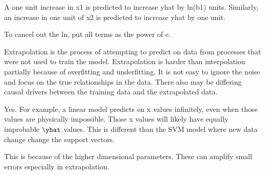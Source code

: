 \documentclass[12pt]{article}
\begin{document}
\begin{enumerate}
A one unit increase in x1 is predicted to increase yhat by ln(b1) units. Similarly, an increase in one unit of x2 is predicted to increase yhat by one unit. 


To cancel out the ln, put all terms as the power of e. 

\end{enumerate}




\begin{enumerate}


Extrapolation is the process of attempting to predict on data from processes that were not used to train the model. Extrapolation is harder than interpolation partially because of overfitting and underfitting. It is not easy to ignore the noise and focus on the true relationships in the data. There also may be differing causal drivers between the training data and the extrapolated data.  


Yes. For example, a linear model predicts on x values infinitely, even when those values are physically impossible. Those x values will likely have equally improbable $\yhat$ values. This is different than the SVM model where new data change change the support vectors.


This is because of the higher dimensional parameters. These can amplify small errors especially in extrapolation. 

\end{enumerate}
\end{document}
